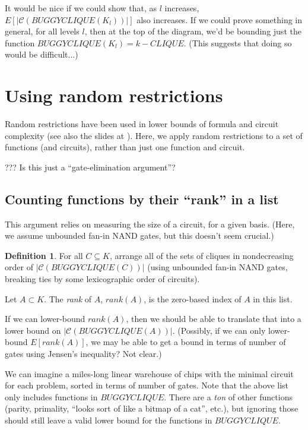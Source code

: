 \documentclass[12pt]{article}
\theoremstyle{definition}
\newtheorem{defn}{Definition}[section]
\newcommand{\bigC}[0]{\mathcal{C}}
\begin{document}
It would be nice if we could show that, as $l$ increases,
$E[|\bigC(BUGGYCLIQUE(K_l))|]$ also increases.
If we could prove something in general, for all levels $l$, then at
the top of the diagram, we'd be bounding just the function
$BUGGYCLIQUE(K_l) = k-CLIQUE$. (This suggests that doing so would
be difficult...)


\section{Using random restrictions}

Random restrictions have been used in lower bounds of formula
\cite{subbotovskaya1963comparison} and circuit \cite{hastad1987lower}
complexity (see also the slides at \cite{rossmanRestrictions}).
Here, we apply random restrictions to a set of functions (and circuits),
rather than just one function and circuit.

??? Is this just a ``gate-elimination argument''?

\subsection{Counting functions by their ``rank'' in a list}

This argument relies on measuring the size of a circuit,
for a given basis. (Here, we assume unbounded fan-in
NAND gates, but this doesn't seem crucial.)

\begin{defn}
\label{Rank}
For all $C \subseteq K$,
arrange all of the sets of cliques in nondecreasing order
of $|\bigC(BUGGYCLIQUE(C))|$ (using unbounded fan-in NAND gates,
breaking ties by some lexicographic order of circuits).

Let $A \subset K$. The {\em rank} of $A$, $rank(A)$, is the zero-based
index of $A$ in this list.
\end{defn}

If we can lower-bound $rank(A)$, then we should be able to translate
that into a
lower bound on $|\bigC(BUGGYCLIQUE(A))|$. (Possibly, if we
can only lower-bound $E[rank(A)]$, we may be able to get
a bound in terms of number of gates using Jensen's inequality?
Not clear.)

We can imagine a miles-long linear warehouse of chips with the minimal
circuit for each problem, sorted in terms of number of gates.
Note that the above list only includes functions in $BUGGYCLIQUE$.
There are a {\em ton} of other functions (parity, primality, ``looks
sort of like a bitmap of a cat'', etc.), but ignoring
those should still leave a valid lower bound for the functions in $BUGGYCLIQUE$.
\end{document}
